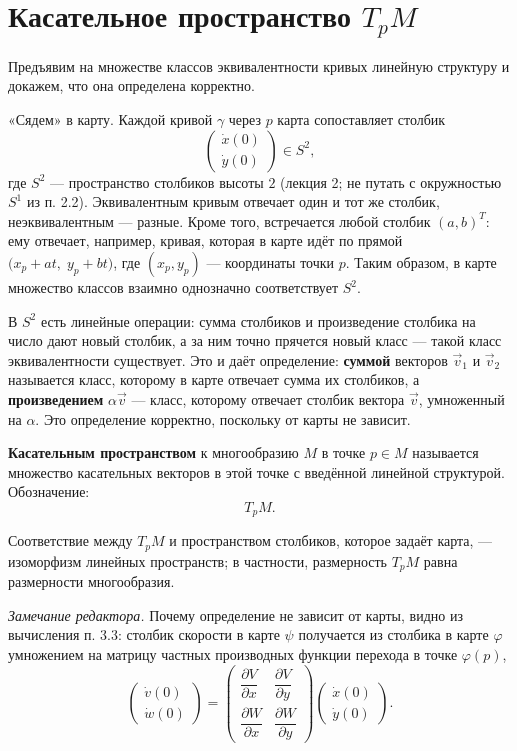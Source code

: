 \documentclass[11pt,a4paper]{article}
\begin{document}
\section{Касательное пространство $T_pM$}

Предъявим на множестве классов эквивалентности кривых линейную структуру и докажем, что она определена корректно.

«Сядем» в карту. Каждой кривой $\gamma$ через $p$ карта сопоставляет столбик
\[
\begin{pmatrix} \dot x(0) \\ \dot y(0) \end{pmatrix} \in S^2,
\]
где $S^2$ — пространство столбиков высоты $2$ (лекция 2; не путать с окружностью $S^1$ из п. 2.2). Эквивалентным кривым отвечает один и тот же столбик, неэквивалентным — разные. Кроме того, встречается любой столбик $(a, b)^T$: ему отвечает, например, кривая, которая в карте идёт по прямой $\bigl(x_p + a t,\; y_p + b t\bigr)$, где $(x_p, y_p)$ — координаты точки $p$. Таким образом, в карте множество классов взаимно однозначно соответствует $S^2$.

В $S^2$ есть линейные операции: сумма столбиков и произведение столбика на число дают новый столбик, а за ним точно прячется новый класс — такой класс эквивалентности существует. Это и даёт определение: \textbf{суммой} векторов $\vec v_1$ и $\vec v_2$ называется класс, которому в карте отвечает сумма их столбиков, а \textbf{произведением} $\alpha \vec v$ — класс, которому отвечает столбик вектора $\vec v$, умноженный на $\alpha$. Это определение корректно, поскольку от карты не зависит.

\textbf{Касательным пространством} к многообразию $M$ в точке $p \in M$ называется множество касательных векторов в этой точке с введённой линейной структурой. Обозначение:
\[
T_pM.
\]

Соответствие между $T_pM$ и пространством столбиков, которое задаёт карта, — изоморфизм линейных пространств; в частности, размерность $T_pM$ равна размерности многообразия.

\emph{Замечание редактора.} Почему определение не зависит от карты, видно из вычисления п. 3.3: столбик скорости в карте $\psi$ получается из столбика в карте $\varphi$ умножением на матрицу частных производных функции перехода в точке $\varphi(p)$,
\[
\begin{pmatrix} \dot v(0) \\[4pt] \dot w(0) \end{pmatrix} = \begin{pmatrix} \dfrac{\partial V}{\partial x} & \dfrac{\partial V}{\partial y} \\[8pt] \dfrac{\partial W}{\partial x} & \dfrac{\partial W}{\partial y} \end{pmatrix} \begin{pmatrix} \dot x(0) \\[4pt] \dot y(0) \end{pmatrix}.
\]
\end{document}
